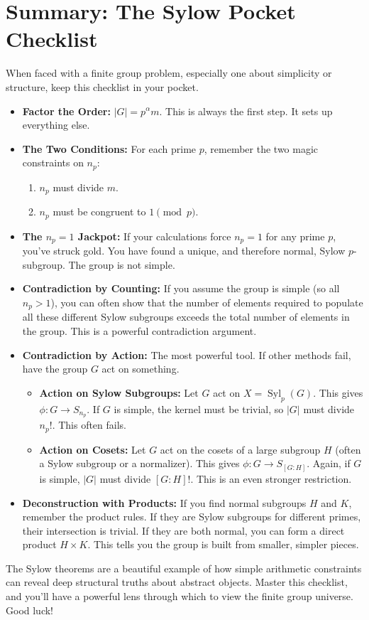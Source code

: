 \documentclass[12pt,a4paper]{article}
\newcommand{\tick}{\ensuremath{\checkmark}} %
\theoremstyle{plain} %
\theoremstyle{definition} %
\theoremstyle{remark} %
\DeclareMathOperator{\Syl}{Syl}
\begin{document}
\newpage
\section*{Summary: The Sylow Pocket Checklist}

When faced with a finite group problem, especially one about simplicity or structure, keep this checklist in your pocket.

\begin{itemize}[label=\tick]
  \item \textbf{Factor the Order:} $|G| = p^\alpha m$. This is always the first step. It sets up everything else.

  \item \textbf{The Two Conditions:} For each prime $p$, remember the two magic constraints on $n_p$:
    \begin{enumerate}
        \item $n_p$ must divide $m$.
        \item $n_p$ must be congruent to $1 \pmod p$.
    \end{enumerate}

  \item \textbf{The $n_p=1$ Jackpot:} If your calculations force $n_p=1$ for any prime $p$, you've struck gold. You have found a unique, and therefore normal, Sylow $p$-subgroup. The group is not simple.

  \item \textbf{Contradiction by Counting:} If you assume the group is simple (so all $n_p > 1$), you can often show that the number of elements required to populate all these different Sylow subgroups exceeds the total number of elements in the group. This is a powerful contradiction argument.

  \item \textbf{Contradiction by Action:} The most powerful tool. If other methods fail, have the group $G$ act on something.
    \begin{itemize}
        \item \textbf{Action on Sylow Subgroups:} Let $G$ act on $X=\Syl_p(G)$. This gives $\phi: G \to S_{n_p}$. If $G$ is simple, the kernel must be trivial, so $|G|$ must divide $n_p!$. This often fails.
        \item \textbf{Action on Cosets:} Let $G$ act on the cosets of a large subgroup $H$ (often a Sylow subgroup or a normalizer). This gives $\phi: G \to S_{[G:H]}$. Again, if $G$ is simple, $|G|$ must divide $[G:H]!$. This is an even stronger restriction.
    \end{itemize}

  \item \textbf{Deconstruction with Products:} If you find normal subgroups $H$ and $K$, remember the product rules. If they are Sylow subgroups for different primes, their intersection is trivial. If they are both normal, you can form a direct product $H \times K$. This tells you the group is built from smaller, simpler pieces.
\end{itemize}

The Sylow theorems are a beautiful example of how simple arithmetic constraints can reveal deep structural truths about abstract objects. Master this checklist, and you'll have a powerful lens through which to view the finite group universe. Good luck!
\end{document}
